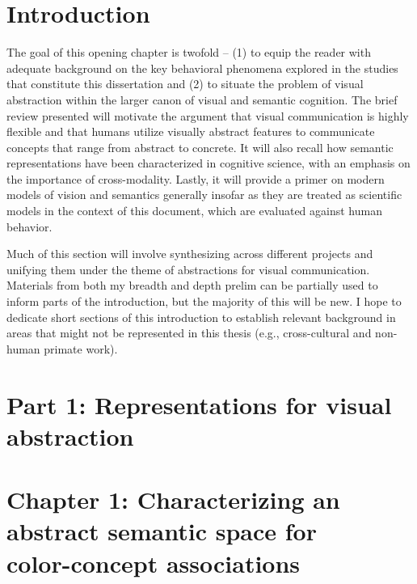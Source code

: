 \documentclass{Dissertate}
\begin{document}
\section*{\textbf{Introduction}}

The goal of this opening chapter is twofold -- (1) to equip the reader with adequate background on the key behavioral phenomena explored in the studies that constitute this dissertation and (2) to situate the problem of visual abstraction within the larger canon of visual and semantic cognition.
The brief review presented will motivate the argument that visual communication is highly flexible and that humans utilize visually abstract features to communicate  concepts that range from abstract to concrete.
It will also recall how semantic representations have been characterized in cognitive science, with an emphasis on the importance of cross-modality.
Lastly, it will provide a primer on modern models of vision and semantics generally insofar as they are treated as scientific models in the context of this document, which are evaluated against human behavior.

\begin{tcolorbox}[
    colback=gray!10,  %
    colframe=black!50, %
    arc=4mm,         %
    boxrule=2pt      %
]
Much of this section will involve synthesizing across different projects and unifying them under the theme of abstractions for visual communication. 
Materials from both my breadth and depth prelim can be partially used to inform parts of the introduction, but the majority of this will be new. 
I hope to dedicate short sections of this introduction to establish relevant background in areas that might not be represented in this thesis (e.g., cross-cultural and non-human primate work).
\end{tcolorbox}


\section*{\textbf{Part 1: Representations for visual abstraction}}
\section*{Chapter 1: Characterizing an abstract semantic space for \\ color-concept associations  }
\end{document}
